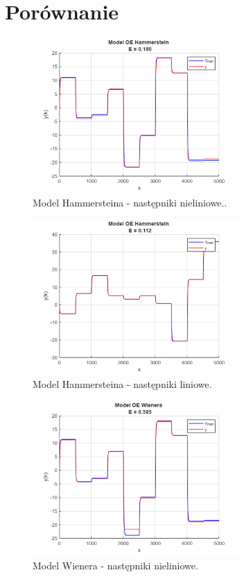 \chapter{Porównanie}

\begin{figure}[h!]
\centering
\includegraphics[width=0.7\textwidth]{pictures/model_hammersteina}
\caption{Model Hammersteina - następniki nieliniowe..}
\end{figure}

\begin{figure}[h!]
\centering
\includegraphics[width=0.7\textwidth]{pictures/model_hammersteina_lin}
\caption{Model Hammersteina - następniki liniowe.}
\end{figure}

\newpage

\begin{figure}[h!]
\centering
\includegraphics[width=0.7\textwidth]{pictures/model_wienera}
\caption{Model Wienera - następniki nieliniowe.}
\end{figure}

